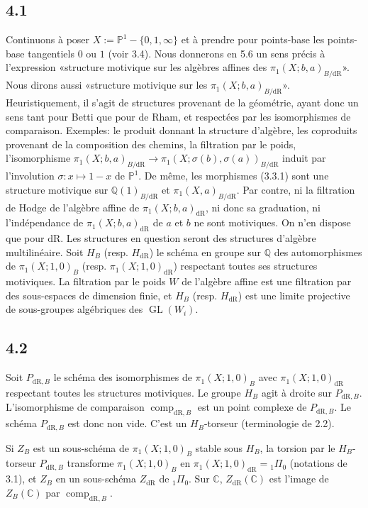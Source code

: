 \documentclass[10pt]{article}
\newcommand{\Q}{\mathbb Q}
\newcommand{\C}{\mathbb C}
\newcommand{\PP}{\mathbb P}
\newcommand{\GL}{\operatorname{GL}}
\newcommand{\comp}{\operatorname{comp}}
\newcommand{\dR}{\mathrm{dR}}
\begin{document}
\subsection*{4.1}
Continuons à poser $X:=\PP^1-\{0,1,\infty\}$ et à prendre pour points-base les points-base tangentiels $0$ ou $1$ (voir 3.4). Nous donnerons en 5.6 un sens précis à l'expression «structure motivique sur les algèbres affines des $\pi_1(X;b,a)_{B/\dR}$». Nous dirons aussi «structure motivique sur les $\pi_1(X;b,a)_{B/\dR}$». Heuristiquement, il s'agit de structures provenant de la géométrie, ayant donc un sens tant pour Betti que pour de Rham, et respectées par les isomorphismes de comparaison. Exemples: le produit donnant la structure d'algèbre, les coproduits provenant de la composition des chemins, la filtration par le poids, l'isomorphisme $\pi_1(X;b,a)_{B/\dR}\to\pi_1(X;\sigma(b),\sigma(a))_{B/\dR}$ induit par l'involution $\sigma:x\mapsto1-x$ de $\PP^1$. De même, les morphismes (3.3.1) sont une structure motivique sur $\Q(1)_{B/\dR}$ et $\pi_1(X,a)_{B/\dR}$. Par contre, ni la filtration de Hodge de l'algèbre affine de $\pi_1(X;b,a)_{\dR}$, ni donc sa graduation, ni l'indépendance de $\pi_1(X;b,a)_{\dR}$ de $a$ et $b$ ne sont motiviques. On n'en dispose que pour $\dR$. Les structures en question seront des structures d'algèbre multilinéaire. Soit $H_B$ (resp. $H_{\dR}$) le schéma en groupe sur $\Q$ des automorphismes de $\pi_1(X;1,0)_B$ (resp. $\pi_1(X;1,0)_{\dR}$) respectant toutes ses structures motiviques. La filtration par le poids $W$ de l'algèbre affine est une filtration par des sous-espaces de dimension finie, et $H_B$ (resp. $H_{\dR}$) est une limite projective de sous-groupes algébriques des $\GL(W_i)$.

\subsection*{4.2}
Soit $P_{\dR,B}$ le schéma des isomorphismes de $\pi_1(X;1,0)_B$ avec $\pi_1(X;1,0)_{\dR}$ respectant toutes les structures motiviques. Le groupe $H_B$ agit à droite sur $P_{\dR,B}$. L'isomorphisme de comparaison $\comp_{\dR,B}$ est un point complexe de $P_{\dR,B}$. Le schéma $P_{\dR,B}$ est donc non vide. C'est un $H_B$-torseur (terminologie de 2.2).

Si $Z_B$ est un sous-schéma de $\pi_1(X;1,0)_B$ stable sous $H_B$, la torsion par le $H_B$-torseur $P_{\dR,B}$ transforme $\pi_1(X;1,0)_B$ en $\pi_1(X;1,0)_{\dR}={}_1\Pi_0$ (notations de 3.1), et $Z_B$ en un sous-schéma $Z_{\dR}$ de ${}_1\Pi_0$. Sur $\C$, $Z_{\dR}(\C)$ est l'image de $Z_B(\C)$ par $\comp_{\dR,B}$.
\end{document}
